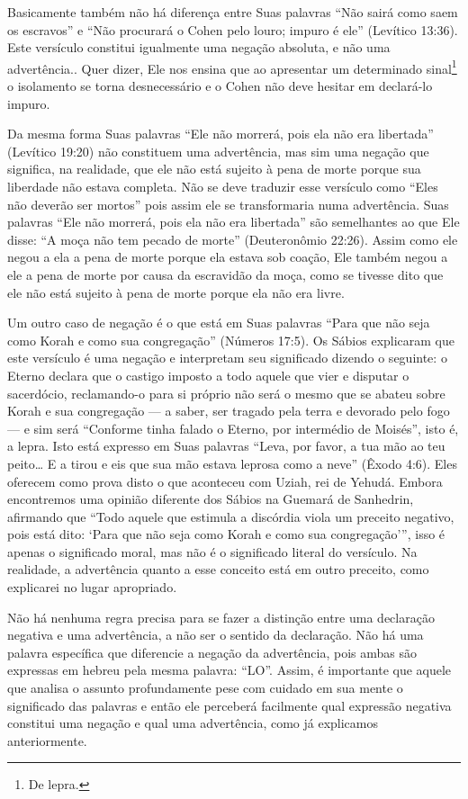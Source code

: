 Basicamente também não há diferença entre Suas palavras ``Não sairá como saem os escravos'' e ``Não procurará o Cohen pelo louro;
impuro
é ele'' (Levítico 13:36). Este versículo constitui igualmente uma
negação absoluta, e não uma advertência.. Quer dizer, Ele nos ensina que ao
apresentar um determinado sinal\footnote{De lepra.} o isolamento se
torna desnecessário e o Cohen não deve hesitar em declará-lo impuro.

Da mesma forma Suas palavras ``Ele não morrerá, pois ela não era
libertada'' (Levítico 19:20) não constituem uma advertência, mas sim uma
negação que significa, na realidade, que ele não está sujeito à pena de
morte porque sua liberdade não estava completa. Não se deve traduzir
esse versículo como ``Eles não deverão ser mortos'' pois assim ele se
transformaria numa advertência. Suas palavras ``Ele não morrerá, pois
ela não era libertada'' são semelhantes ao que Ele disse: ``A moça não tem pecado de morte''
(Deuteronômio 22:26). Assim como ele negou a ela a pena de morte porque
ela estava sob coação, Ele também negou a ele a pena de morte por causa
da escravidão da moça, como se tivesse dito que ele não está sujeito à
pena de morte porque ela não era livre.

Um outro caso de negação é o que está em Suas palavras ``Para que não
seja como Korah e como sua congregação'' (Números 17:5). Os Sábios
explicaram que este versículo é uma negação e interpretam seu
significado dizendo o seguinte: o Eterno declara que o castigo imposto
a todo aquele que vier e disputar o sacerdócio, reclamando-o para si
próprio não será o mesmo que se abateu sobre Korah e sua congregação ---
a saber, ser tragado pela terra e devorado pelo fogo --- e sim será
``Conforme tinha falado o Eterno, por intermédio de Moisés'', isto é, a
lepra. Isto está expresso em Suas palavras ``Leva, por favor, a tua mão
ao teu peito\ldots{} E a tirou e eis que sua mão estava leprosa como a neve''
(Êxodo 4:6). Eles oferecem como prova disto o que aconteceu com Uziah,
rei de Yehudá. Embora encontremos uma opinião diferente dos Sábios na
Guemará de Sanhedrin, afirmando que ``Todo aquele que estimula a
discórdia viola um preceito negativo, pois está dito: `Para que não seja
como Korah e como sua congregação''', isso é apenas o significado moral,
mas não é o significado literal do versículo. Na realidade, a
advertência quanto a esse conceito está em outro preceito, como
explicarei no lugar apropriado.

Não há nenhuma regra precisa para se fazer a distinção entre uma
declaração negativa e uma advertência, a não ser o sentido da
declaração. Não há uma palavra específica que diferencie a negação da
advertência, pois ambas são expressas em hebreu pela mesma palavra:
``LO''. Assim, é importante que aquele que analisa o assunto
profundamente pese com cuidado em sua mente o significado das palavras e
então ele perceberá facilmente qual expressão negativa constitui uma
negação e qual uma advertência, como já explicamos anteriormente.

